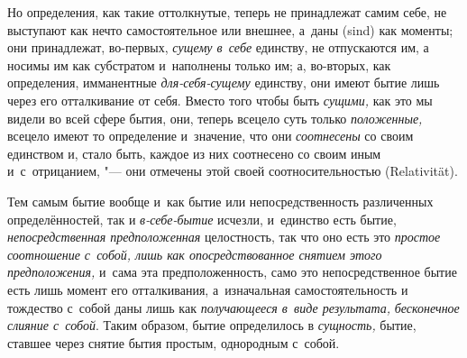 Но определения, как такие оттолкнутые, теперь не принадлежат самим себе, не
выступают как нечто самостоятельное или внешнее, а~даны (sind) как моменты; они
принадлежат, во-первых, {\em сущему в~себе} единству, не отпускаются им, а
носимы им как субстратом и~наполнены только им; а, во-вторых, как определения,
имманентные {\em для-себя-сущему} единству, они имеют бытие лишь через его
отталкивание от себя. Вместо того чтобы быть {\em сущими,} как это мы видели во
всей сфере бытия, они, теперь всецело суть только {\em положенные,} всецело
имеют то определение и~значение, что они {\em соотнесены} со своим единством и,
стало быть, каждое из них соотнесено со своим иным и~с~отрицанием, "--- они
отмечены этой своей соотносительностью (Rela\-tivi\-tät).

Тем самым бытие вообще и~как бытие или непосредственность различенных
определённостей, так и {\em в-себе-бытие} исчезли, и~единство есть бытие,
{\em непосредственная предположенная} целостность, так что оно есть это
{\em простое соотношение с~собой, лишь как опосредствованное снятием
этого предположения,} и~сама эта предположенность, само это непосредственное
бытие есть лишь момент его отталкивания, а~изначальная самостоятельность и
тождество с~собой даны лишь как {\em получающееся в~виде результата,}
{\em бесконечное слияние с~собой}. Таким образом, бытие определилось в
{\em сущность,} бытие, ставшее через снятие бытия простым, однородным с~собой.
